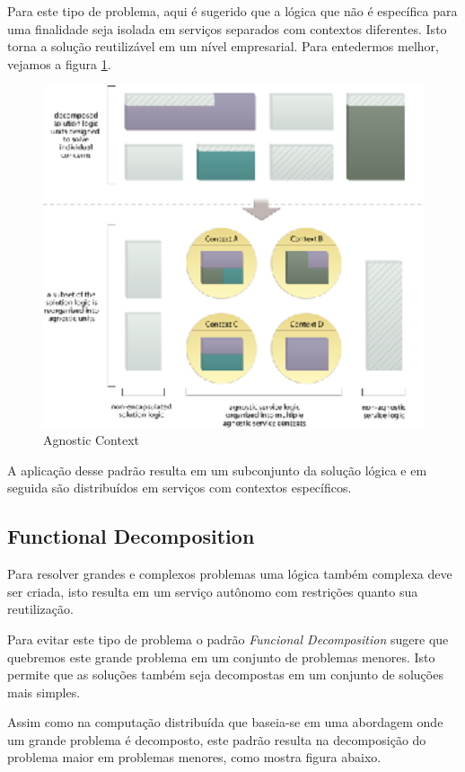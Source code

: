 \documentclass[12pt]{article}
\begin{document}
Para este tipo de problema, aqui é sugerido que a lógica que não é específica para uma finalidade seja isolada em serviços separados com contextos diferentes. Isto torna a solução reutilizável em um nível empresarial. Para entedermos melhor, vejamos a figura \ref{fig:2}.

\begin{figure}[H]
	\centering
	\includegraphics[width=14cm]{img/fig2.eps}
	\caption{Agnostic Context}
	\label{fig:2}
\end{figure}

A aplicação desse padrão resulta em um subconjunto da solução lógica e em seguida são distribuídos em serviços com contextos específicos.

\subsection{Functional Decomposition}

Para resolver grandes e complexos problemas uma lógica também complexa deve ser criada, isto resulta em um serviço autônomo com restrições quanto sua reutilização.

Para evitar este tipo de problema o padrão \textit{Funcional Decomposition} sugere que quebremos este grande problema em um conjunto de problemas menores. Isto permite que as soluções também seja decompostas em um conjunto de soluções mais simples.

Assim como na computação distribuída que baseia-se em uma abordagem  onde um grande problema é decomposto, este padrão resulta na decomposição do problema maior em problemas menores, como mostra figura abaixo.
\end{document}
